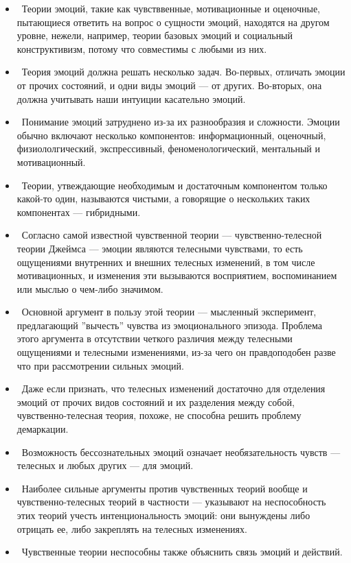 \documentclass[11pt]{book}
\begin{document}
\begin{itemize}
\item\ Теории эмоций, такие как чувстввенные, мотивационные и оценочные, пытающиеся ответить на вопрос о сущности эмоций, находятся на другом уровне, нежели, например, теории базовых эмоций и социальный конструктивизм, потому что совместимы с любыми из них.
\item\ Теория эмоций должна решать несколько задач. Во-первых, отличать эмоции от прочих состояний, и одни виды эмоций --- от других. Во-вторых, она должна учитывать наши интуиции касательно эмоций.
\item\ Понимание эмоций затруднено из-за их разнообразия и сложности. Эмоции обычно включают несколько компонентов: информационный, оценочный, физиололгический, экспрессивный, феноменологический, ментальный и мотивационный.
\item\ Теории, утвеждающие необходимым и достаточным компонентом только какой-то один, называются чистыми, а говорящие о нескольких таких компонентах --- гибридными.
\item\ Согласно самой известной чувственной теории --- чувственно-телесной теории Джеймса --- эмоции являются телесными чувствами, то есть ощущениями внутренних и внешних телесных изменений, в том числе мотивационных, и изменения эти вызываются восприятием, воспоминанием или мыслью о чем-либо значимом.
\item\ Основной аргумент в пользу этой теории --- мысленный эксперимент, предлагающий ''вычесть'' чувства из эмоционального эпизода. Проблема этого аргумента в отсутствии четкого различия между телесными ощущениями и телесными изменениями, из-за чего он правдоподобен разве что при рассмотрении сильных эмоций.
\item\ Даже если признать, что телесных изменений достаточно для отделения эмоций от прочих видов состояний и их разделения между собой, чувственно-телесная теория, похоже, не способна решить проблему демаркации.
\item\ Возможность бессознательных эмоций означает необязательность чувств --- телесных и любых других --- для эмоций.
\item\ Наиболее сильные аргументы против чувственных теорий вообще и чувственно-телесных теорий в частности --- указывают на неспособность этих теорий учесть интенциональность эмоций: они вынуждены либо отрицать ее, либо закреплять на телесных изменениях.
\item\ Чувственные теории неспособны также объяснить связь эмоций и действий.
\end{itemize}
\end{document}
